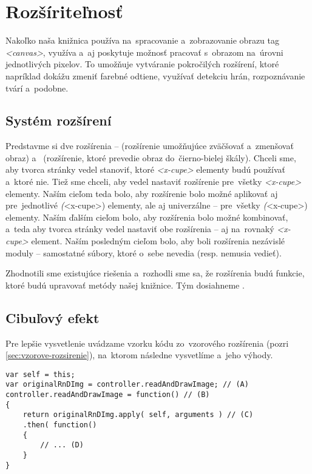 \section{Rozšíriteľnosť}

Nakoľko naša knižnica používa na~spracovanie a~zobrazovanie obrazu tag \emph{<canvas>}, využíva a~aj poskytuje možnosť pracovať s~obrazom na~úrovni jednotlivých pixelov. To umožňuje vytváranie pokročilých rozšírení, ktoré napríklad dokážu zmeniť farebné odtiene, využívať detekciu hrán, rozpoznávanie tvárí a~podobne.

\subsection{Systém rozšírení}
\label{sec:system-rozsireni}

Predstavme si dve rozšírenia --  (rozšírenie umožňujúce zväčšovať a~zmenšovať obraz) a~ (rozšírenie, ktoré prevedie obraz do~čierno-bielej škály). Chceli sme, aby tvorca stránky vedel stanoviť, ktoré \emph{<x-cupe>} elementy budú používať  a~ktoré nie. Tiež sme chceli, aby vedel nastaviť rozšírenie  pre~všetky \emph{<x-cupe>} elementy. Naším cieľom teda bolo, aby rozšírenie bolo možné aplikovať aj pre~jednotlivé \emph(<x-cupe>) elementy, ale aj univerzálne -- pre~všetky \emph(<x-cupe>) elementy. Naším ďalším cieľom bolo, aby rozšírenia bolo možné kombinovať, a~teda aby tvorca stránky vedel nastaviť obe rozšírenia --  aj  na~rovnaký \emph{<x-cupe>} element. Naším posledným cieľom bolo, aby boli rozšírenia nezávislé moduly -- samostatné súbory, ktoré o~sebe nevedia (resp. nemusia vedieť).

Zhodnotili sme existujúce riešenia a~rozhodli sme sa, že rozšírenia budú funkcie, ktoré budú upravovať metódy našej knižnice. Tým dosiahneme .

\subsection{Cibuľový efekt}

Pre lepšie vysvetlenie uvádzame vzorku kódu zo~vzorového rozšírenia  (pozri \ref{sec:vzorove-rozsirenie}), na~ktorom následne vysvetlíme  a~jeho výhody.

\begin{lstlisting}[label=vytvaranie-cibuloveho-efektu,caption=Vytváranie cibuľového efektu.]
var self = this;
var originalRnDImg = controller.readAndDrawImage; // (A)
controller.readAndDrawImage = function() // (B)
{
    return originalRnDImg.apply( self, arguments ) // (C)
    .then( function()
    {
        // ... (D)
    }
}
\end{lstlisting}

